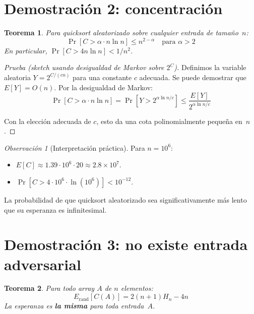 \documentclass[11pt, letterpaper]{article}
\theoremstyle{definition}
\theoremstyle{plain}
\newtheorem{theorem}{Teorema}[section]
\theoremstyle{remark}
\newtheorem{remark}{Observación}[section]
\begin{document}
\section{Demostración 2: concentración}

\begin{theorem}\label{thm:concentration}
Para quicksort aleatorizado sobre cualquier entrada de tamaño~$n$:
\[
  \Pr[C > \alpha \cdot n \ln n] \leq n^{2 - \alpha}
  \quad \text{para } \alpha > 2
\]
En particular, $\Pr[C > 4n\ln n] < 1/n^2$.
\end{theorem}

\begin{proof}[Prueba (sketch usando desigualdad de Markov sobre $2^C$)]
Definimos la variable aleatoria $Y = 2^{C/(cn)}$ para una constante
$c$ adecuada. Se puede demostrar que $E[Y] = O(n)$. Por la
desigualdad de Markov:
\[
  \Pr[C > \alpha \cdot n \ln n]
  = \Pr\!\left[Y > 2^{\alpha \ln n / c}\right]
  \leq \frac{E[Y]}{2^{\alpha \ln n / c}}
\]

Con la elección adecuada de $c$, esto da una cota polinomialmente
pequeña en~$n$.
\end{proof}

\begin{remark}[Interpretación práctica]
Para $n = 10^6$:
\begin{itemize}
  \item $E[C] \approx 1.39 \cdot 10^6 \cdot 20 \approx 2.8 \times 10^7$.
  \item $\Pr[C > 4 \cdot 10^6 \cdot \ln(10^6)] < 10^{-12}$.
\end{itemize}
La probabilidad de que quicksort aleatorizado sea significativamente
más lento que su esperanza es infinitesimal.
\end{remark}

\section{Demostración 3: no existe entrada adversarial}

\begin{theorem}\label{thm:no-adversary}
Para todo array $A$ de $n$ elementos:
\[
  E_{\mathrm{rand}}[C(A)] = 2(n+1)H_n - 4n
\]
La esperanza es \textbf{la misma} para toda entrada~$A$.
\end{theorem}
\end{document}
